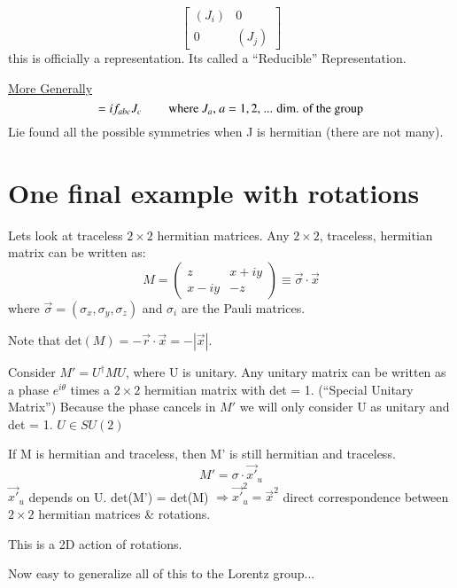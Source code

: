 {\begin{equation*}
\begin{bmatrix} \left(J_i\right) &  0  \\ 0  & \left(J_j\right) \end{bmatrix}
\end{equation*}
this is officially a representation.  
Its called a ``Reducible'' Representation.

\underline{More Generally} 
\begin{equation*}
[J_a, J_b] = i f_{abc} J_c \hspace{0.3in} \textrm{where $J_a$, $ a = 1, 2,$ ... dim. of the group}
\end{equation*}
Lie found all the possible symmetries when J is hermitian (there are not many).

\section*{One final example with rotations}
Lets look at traceless $2\times2$ hermitian matrices. 
Any $2\times2$, traceless, hermitian matrix can be written as: 
\begin{equation*}
M = \begin{pmatrix} z &  x+iy  \\ x-iy  & -z \end{pmatrix} \equiv \vec{\sigma} \cdot \vec{x}
\end{equation*}
where $\vec{\sigma} = (\sigma_x, \sigma_y, \sigma_z)$ and $\sigma_i$ are the Pauli matrices.

Note that $\textrm{det}(M) = - \vec{r}\cdot\vec{x} = - |\vec{x}|$.

Consider $M'=U^{\dagger}MU$, where U is unitary.
Any unitary matrix can be written as a phase $e^{i\theta}$ times a $2\times2$ hermitian matrix with det = 1.  (``Special Unitary Matrix'')
Because the phase cancels in $M'$ we will only consider U as unitary and det = 1. 
$U \in SU(2)$

If M is hermitian and traceless, then M' is still hermitian and traceless.
\begin{equation*}
M' = \sigma \cdot \vec{x'}_u
\end{equation*}
$\vec{x'}_{u} $ depends on U.  det(M') = det(M) $\Rightarrow \vec{x'}_u^2 = {\vec{x}}^2 $%
direct correspondence between $2\times2$ hermitian matrices \& rotations.

This is a 2D action of rotations.

Now easy to generalize all of this to the Lorentz group...

}



